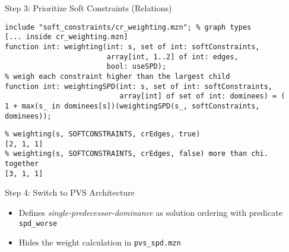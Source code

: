 \documentclass[10pt,xcolor={dvipsnames},fleqn]{beamer}
\begin{document}
\begin{frame}[fragile]{Step 3: Prioritize Soft Constraints (Relations)}
\begin{lstlisting}
include "soft_constraints/cr_weighting.mzn"; % graph types
[... inside cr_weighting.mzn]
function int: weighting(int: s, set of int: softConstraints,
                        array[int, 1..2] of int: edges,
                        bool: useSPD); 
% weigh each constraint higher than the largest child
function int: weightingSPD(int: s, set of int: softConstraints, 
                           array[int] of set of int: dominees) = (
1 + max(s_ in dominees[s])(weightingSPD(s_, softConstraints, dominees));

\end{lstlisting}
\begin{lstlisting}
% weighting(s, SOFTCONSTRAINTS, crEdges, true) 
[2, 1, 1]
% weighting(s, SOFTCONSTRAINTS, crEdges, false) more than chi. together
[3, 1, 1]
\end{lstlisting}
\begin{center}
\end{center}
\end{frame}

\begin{frame}[fragile]{Step 4: Switch to PVS Architecture}

\small
\begin{itemize}
\item Defines \emph{single-predecessor-dominance} as solution ordering with predicate
\texttt{spd\_worse}
\item Hides the weight calculation in \texttt{pvs\_spd.mzn}
\end{itemize}
\end{frame}
\end{document}
